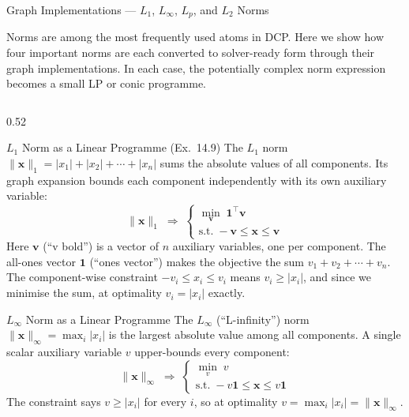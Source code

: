 \documentclass[aspectratio=169,10pt]{beamer}
\begin{document}
\begin{frame}[allowframebreaks]{Graph Implementations --- $L_1$, $L_\infty$, $L_p$, and $L_2$ Norms}

  Norms are among the most frequently used atoms in DCP.  Here we
  show how four important norms are each converted to solver-ready
  form through their graph implementations.  In each case, the
  potentially complex norm expression becomes a small LP or conic
  programme.

  \begin{columns}
    \begin{column}{0.52\textwidth}
      \begin{block}{$L_1$ Norm as a Linear Programme (Ex.\ 14.9)}
        The $L_1$ norm $\|\mathbf{x}\|_1 = |x_1| + |x_2| + \cdots +
        |x_n|$ sums the absolute values of all components.  Its graph
        expansion bounds each component independently with its own
        auxiliary variable:
        \[
          \|\mathbf{x}\|_1 \;\Rightarrow\;
          \begin{cases}
            \min_{\mathbf{v}}\; \mathbf{1}^{\top}\mathbf{v}\\[2pt]
            \text{s.t.}\; -\mathbf{v} \leq \mathbf{x} \leq \mathbf{v}
          \end{cases}
        \]
        Here $\mathbf{v}$ (``v bold'') is a vector of $n$ auxiliary
        variables, one per component.  The all-ones vector
        $\mathbf{1}$ (``ones vector'') makes the objective the sum
        $v_1 + v_2 + \cdots + v_n$.  The component-wise constraint
        $-v_i \leq x_i \leq v_i$ means $v_i \geq |x_i|$, and since
        we minimise the sum, at optimality $v_i = |x_i|$ exactly.
      \end{block}

      \begin{block}{$L_\infty$ Norm as a Linear Programme}
        The $L_\infty$ (``L-infinity'') norm
        $\|\mathbf{x}\|_\infty = \max_i |x_i|$ is the largest
        absolute value among all components.  A single scalar
        auxiliary variable $v$ upper-bounds every component:
        \[
          \|\mathbf{x}\|_\infty \;\Rightarrow\;
          \begin{cases}
            \min_{v}\; v\\[2pt]
            \text{s.t.}\; -v\mathbf{1} \leq \mathbf{x} \leq v\mathbf{1}
          \end{cases}
        \]
        The constraint says $v \geq |x_i|$ for every $i$, so at
        optimality $v = \max_i |x_i| = \|\mathbf{x}\|_\infty$.
      \end{block}


\end{column}
\end{columns}
\end{frame}
\end{document}
